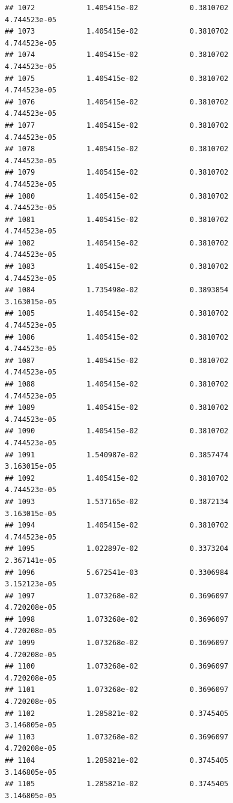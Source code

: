 \documentclass[
]{article}
\begin{document}
\begin{verbatim}
## 1072            1.405415e-02            0.3810702            4.744523e-05
## 1073            1.405415e-02            0.3810702            4.744523e-05
## 1074            1.405415e-02            0.3810702            4.744523e-05
## 1075            1.405415e-02            0.3810702            4.744523e-05
## 1076            1.405415e-02            0.3810702            4.744523e-05
## 1077            1.405415e-02            0.3810702            4.744523e-05
## 1078            1.405415e-02            0.3810702            4.744523e-05
## 1079            1.405415e-02            0.3810702            4.744523e-05
## 1080            1.405415e-02            0.3810702            4.744523e-05
## 1081            1.405415e-02            0.3810702            4.744523e-05
## 1082            1.405415e-02            0.3810702            4.744523e-05
## 1083            1.405415e-02            0.3810702            4.744523e-05
## 1084            1.735498e-02            0.3893854            3.163015e-05
## 1085            1.405415e-02            0.3810702            4.744523e-05
## 1086            1.405415e-02            0.3810702            4.744523e-05
## 1087            1.405415e-02            0.3810702            4.744523e-05
## 1088            1.405415e-02            0.3810702            4.744523e-05
## 1089            1.405415e-02            0.3810702            4.744523e-05
## 1090            1.405415e-02            0.3810702            4.744523e-05
## 1091            1.540987e-02            0.3857474            3.163015e-05
## 1092            1.405415e-02            0.3810702            4.744523e-05
## 1093            1.537165e-02            0.3872134            3.163015e-05
## 1094            1.405415e-02            0.3810702            4.744523e-05
## 1095            1.022897e-02            0.3373204            2.367141e-05
## 1096            5.672541e-03            0.3306984            3.152123e-05
## 1097            1.073268e-02            0.3696097            4.720208e-05
## 1098            1.073268e-02            0.3696097            4.720208e-05
## 1099            1.073268e-02            0.3696097            4.720208e-05
## 1100            1.073268e-02            0.3696097            4.720208e-05
## 1101            1.073268e-02            0.3696097            4.720208e-05
## 1102            1.285821e-02            0.3745405            3.146805e-05
## 1103            1.073268e-02            0.3696097            4.720208e-05
## 1104            1.285821e-02            0.3745405            3.146805e-05
## 1105            1.285821e-02            0.3745405            3.146805e-05

\end{verbatim}
\end{document}
